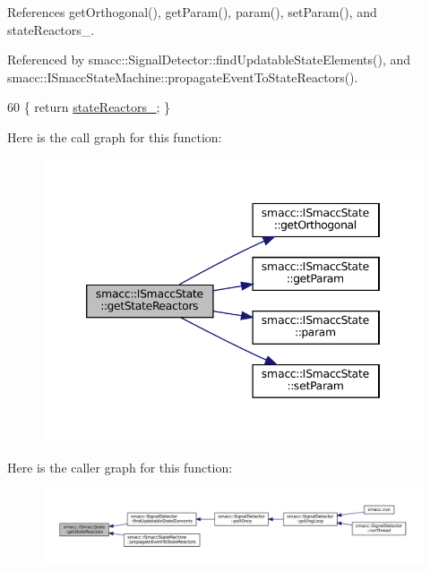 References get\+Orthogonal(), get\+Param(), param(), set\+Param(), and state\+Reactors\+\_\+.



Referenced by smacc\+::\+Signal\+Detector\+::find\+Updatable\+State\+Elements(), and smacc\+::\+I\+Smacc\+State\+Machine\+::propagate\+Event\+To\+State\+Reactors().


\begin{DoxyCode}
60 \{ \textcolor{keywordflow}{return} \hyperlink{classsmacc_1_1ISmaccState_a7410a353b515f7b7357e94ef619a6c45}{stateReactors\_}; \}
\end{DoxyCode}
Here is the call graph for this function\+:
\nopagebreak
\begin{figure}[H]
\begin{center}
\leavevmode
\includegraphics[width=346pt]{classsmacc_1_1ISmaccState_acc40f4b3dd02a39242c7e23fe13c3e16_cgraph}
\end{center}
\end{figure}
Here is the caller graph for this function\+:
\nopagebreak
\begin{figure}[H]
\begin{center}
\leavevmode
\includegraphics[width=350pt]{classsmacc_1_1ISmaccState_acc40f4b3dd02a39242c7e23fe13c3e16_icgraph}
\end{center}
\end{figure}
\mbox{\label{classsmacc_1_1ISmaccState_a98df316afd79180d3c27a15a7d5dd1cf}} 
